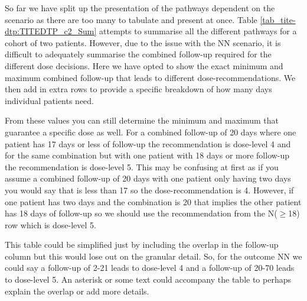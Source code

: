 So far we have split up the presentation of the pathways dependent on the scenario as there are too many to tabulate and present at once. Table \ref{tab_tite-dtp:TITEDTP_c2_Sum} attempts to summarise all the different pathways for a cohort of two patients. However, due to the issue with the NN scenario, it is difficult to adequately summarise the combined follow-up required for the different dose decisions. Here we have opted to show the exact minimum and maximum combined follow-up that leads to different dose-recommendations. We then add in extra rows to provide a specific breakdown of how many days individual patients need.  

From these values you can still determine the minimum and maximum that guarantee a specific dose as well. For a combined follow-up of 20 days where one patient has 17 days or less of follow-up the recommendation is dose-level 4 and for the same combination but with one patient with 18 days or more follow-up the recommendation is dose-level 5. This may be confusing at first as if you assume a combined follow-up of 20 days with one patient only having two days you would say that is less than 17 so the dose-recommendation is 4. However, if one patient has two days and the combination is 20 that implies the other patient has 18 days of follow-up so we should use the recommendation from the N($\geq$18) row which is dose-level 5.

This table could be simplified just by including the overlap in the follow-up column but this would lose out on the granular detail. So, for the outcome NN we could say a follow-up of 2-21 leads to dose-level 4 and a follow-up of 20-70 leads to dose-level 5. An asterisk or some text could accompany the table to perhaps explain the overlap or add more details. 

